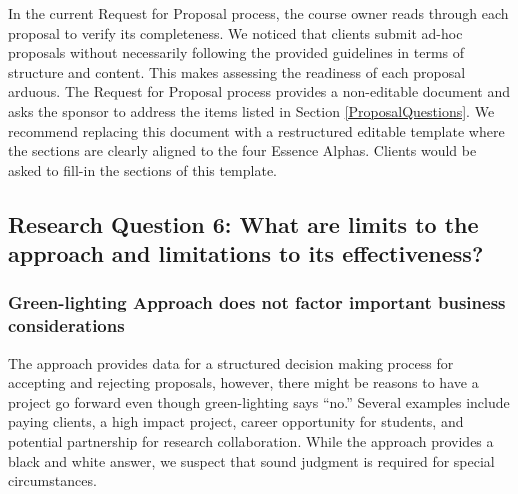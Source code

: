
In the current Request for Proposal process, the course owner reads
through each proposal to verify its completeness. We noticed that
clients submit ad-hoc proposals without necessarily following the
provided guidelines in terms of structure and content. This makes
assessing the readiness of each proposal arduous. The Request for
Proposal process provides a non-editable document and asks the sponsor
to address the items listed in Section
\ref{ProposalQuestions}. We recommend replacing this
document with a restructured editable template where the sections are
clearly aligned to the four Essence Alphas. Clients would be asked to
fill-in the sections of this template. 


\subsection{Research Question 6: What are limits to
the approach and limitations to its effectiveness?}

\subsubsection{Green-lighting Approach does not factor important business considerations}
The approach provides data for a structured decision making process for
accepting and rejecting proposals, however, there might be reasons to
have a project go forward even though green-lighting says ``no.''
Several examples include paying clients, a high impact project, career
opportunity for students, and potential partnership for research
collaboration. While the approach provides a black and white answer,
we suspect that sound judgment is required for special circumstances.

